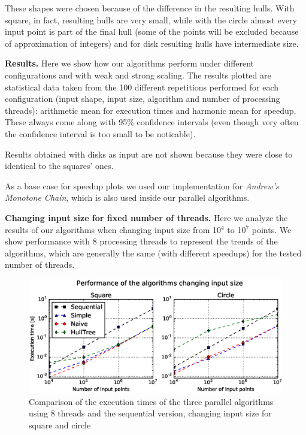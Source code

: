 \documentclass[letterpaper]{article}
\newcommand{\mypar}[1]{{\bf #1.}}
\theoremstyle{definition}
\begin{document}
These shapes were chosen because of the difference in the resulting hulls.
With square, in fact, resulting hulls are very small, while with the circle almost every input point is part of the final hull (some of the points will be excluded because of approximation of integers) and for disk resulting hulls have intermediate size.

\mypar{Results}
Here we show how our algorithms perform under different configurations and with weak and strong scaling.
The results plotted are statistical data taken from the 100 different repetitions performed for each configuration (input shape, input size, algorithm and number of processing threads): arithmetic mean for execution times and harmonic mean for speedup.
These always come along with 95\% confidence intervals (even though very often the confidence interval is too small to be noticable).

Results obtained with disks as input are not shown because they were close to identical to the squares' ones.

As a base case for speedup plots we used our implementation for \textit{Andrew's Monotone Chain}, which is also used inside our parallel algorithms.

\mypar{Changing input size for fixed number of threads}
Here we analyze the results of our algorithms when changing input size from 10$^4$ to 10$^7$ points. 
We show performance with 8 processing threads to represent the trends of the algorithms, which are generally the same (with different speedups) for the tested number of threads.

\begin{figure}[!ht]\centering
  \includegraphics[scale=0.33]{./plots/time_points.eps}
  \caption{Comparison of the execution times of the three parallel algorithms using 8 threads and the sequential version, changing input size for square and circle\label{Input size time}}
\end{figure}
\end{document}
